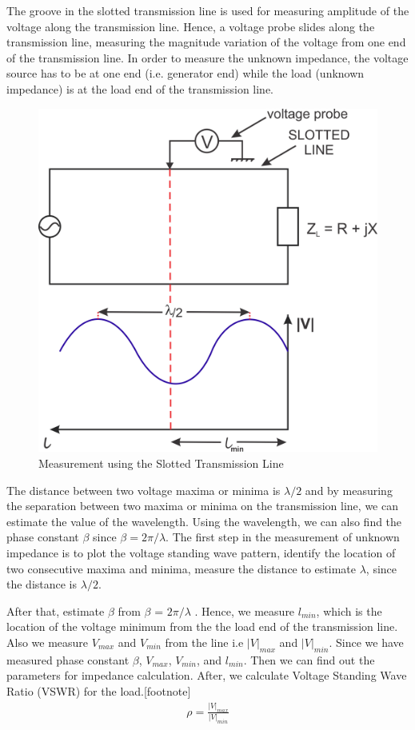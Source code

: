 The groove in the slotted transmission line is used for measuring amplitude of the voltage along the transmission line. Hence, a voltage probe slides along the transmission line, measuring the magnitude variation of the voltage from one end of the transmission line. In order to measure the unknown impedance, the voltage source has to be at one end (i.e. generator end) while the load (unknown impedance) is at the load end of the transmission line.
\begin{figure}[h]
\centering
\includegraphics[width=1\linewidth]{./graphics/group10diagram1}
\caption{Measurement using the Slotted Transmission Line}
\end{figure}

The distance between two voltage maxima or minima is $\lambda/2$ and by measuring the separation between two maxima or minima on the transmission line, we can estimate the value of the wavelength. Using the wavelength, we can also find the phase constant $\beta$ since $\beta = 2\pi/\lambda$. The first step in the measurement of unknown impedance is to plot the voltage standing wave pattern, identify the location of two consecutive maxima and minima, measure the distance to estimate $\lambda$, since the distance is $\lambda/2$.

After that, estimate $\beta$ from $\beta$ = $2\pi/\lambda$ . Hence, we measure $l_{min}$, which is the location of the voltage minimum from the the load end of the transmission line. Also we measure $V_{max}$ and $V_{min}$ from the line i.e $|V|_{max}$ and $|V|_{min}$. Since we have measured phase constant $\beta$, $V_{max}$, $V_{min}$, and $l_{min}$. Then we can find out the parameters for impedance calculation. After, we calculate Voltage Standing Wave Ratio (VSWR) for the load.[footnote]
\begin{align}
\rho = \frac{|V|_{max}}{|V|_{min}}
\end{align}

